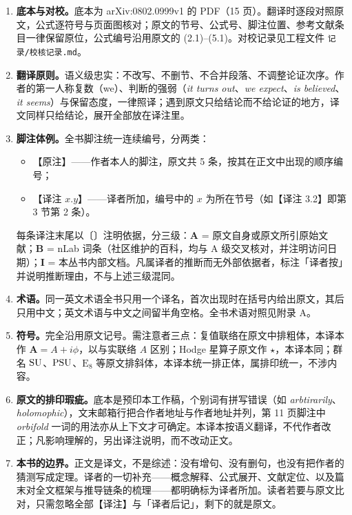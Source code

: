\begin{enumerate}[leftmargin=1.6em,itemsep=0.45em,topsep=0.2em]

\item \textbf{底本与对校。}底本为 arXiv:0802.0999v1 的 PDF（15 页）。翻译时逐段对照原文，公式逐符号与页面图核对；原文的节号、公式号、脚注位置、参考文献条目一律保留原位，公式编号沿用原文的 (2.1)–(5.1)。对校记录见工程文件 \texttt{记录/校核记录.md}。

\item \textbf{翻译原则。}语义级忠实：不改写、不删节、不合并段落、不调整论证次序。作者的第一人称复数（we）、判断的强弱（\textit{it turns out}、\textit{we expect}、\textit{is believed}、\textit{it seems}）与保留态度，一律照译；遇到原文只给结论而不给论证的地方，译文同样只给结论，展开全部放在译注里。

\item \textbf{脚注体例。}全书脚注统一连续编号，分两类：
  \begin{itemize}[leftmargin=1.2em,itemsep=0.1em,topsep=0.1em]
  \item【原注】——作者本人的脚注，原文共 5 条，按其在正文中出现的顺序编号；
  \item【译注 $x.y$】——译者所加，编号中的 $x$ 为所在节号（如【译注 3.2】即第 3 节第 2 条）。
  \end{itemize}
  每条译注末尾以〔〕注明依据，分三级：\textbf{A} = 原文自身或原文所引原始文献；\textbf{B} = nLab 词条（社区维护的百科，均与 A 级交叉核对，并注明访问日期）；\textbf{I} = 本丛书内部文档。凡属译者的推断而无外部依据者，标注「译者按」并说明推断理由，不与上述三级混同。

\item \textbf{术语。}同一英文术语全书只用一个译名，首次出现时在括号内给出原文，其后只用中文；英文术语与中文之间留半角空格。全书术语对照见附录 A。

\item \textbf{符号。}完全沿用原文记号。需注意者三点：复值联络在原文中排粗体，本译本作 $\bm{A}=A+i\phi$，以与实联络 $A$ 区别；Hodge 星算子原文作 $\star$，本译本同；群名 $\operatorname{SU}$、$\operatorname{PSU}$、$\mathrm{E}_8$ 等原文排斜体，本译本统一排正体，属排印统一，不涉内容。

\item \textbf{原文的排印瑕疵。}底本是预印本工作稿，个别词有拼写错误（如 \textit{arbtirarily}、\textit{holomophic}），文末邮箱行把合作者地址与作者地址并列，第 11 页脚注中 \textit{orbifold} 一词的用法亦从上下文才可确定。本译本按语义翻译，不代作者改正；凡影响理解的，另出译注说明，而不改动正文。

\item \textbf{本书的边界。}正文是译文，不是综述：没有增句、没有删句，也没有把作者的猜测写成定理。译者的一切补充——概念解释、公式展开、文献定位、以及篇末对全文框架与推导链条的梳理——都明确标为译者所加。读者若要与原文比对，只需忽略全部【译注】与「译者后记」，剩下的就是原文。

\end{enumerate}

